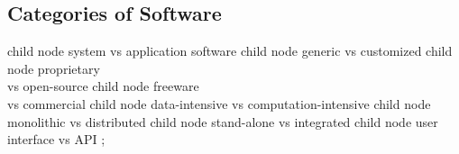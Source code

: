 


\subsection{Categories of Software}
\begin{frame}{\insertsubsection}
	\centering\tikz[grow cyclic,
	mindmap, every node/.style=concept,concept color=blue!10!background,
	level 1/.append style={level distance=27mm,sibling angle=360/8}]
	child { node {system vs\phantom{;} application software\phantom{ab}} }
	child { node {generic vs customized} }
	child { node {proprietary\\vs open-source} }
	child { node {freeware\\vs commercial} }
	child { node {data-intensive vs computation-intensive} }
	child { node {monolithic vs distributed} }
	child { node {stand-alone vs integrated} }
	child { node {user interface vs API\phantom{ab}} }
	;
\end{frame}




